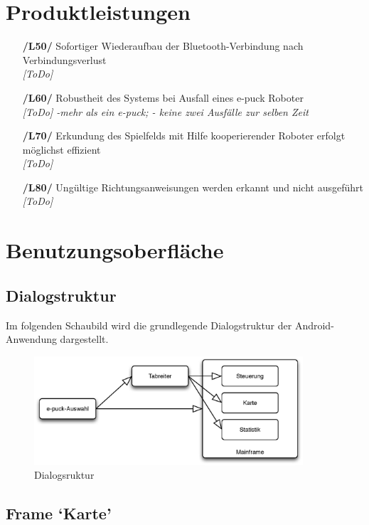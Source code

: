 \documentclass[10pt,a4paper]{article}
\let\oldsection\section
\renewcommand{\section}{\newpage \oldsection}
\begin{document}
	\section{Produktleistungen}
		\begin{itemize}
			\item[\textbf{/L50/}] Sofortiger Wiederaufbau der Bluetooth-Verbindung nach Verbindungsverlust
				\\ \textsl{[ToDo]}
			\item[\textbf{/L60/}] Robustheit des Systems bei Ausfall eines e-puck Roboter
				\\ \textsl{[ToDo] -mehr als ein e-puck; - keine zwei Ausfälle zur selben Zeit}
			\item[\textbf{/L70/}] Erkundung des Spielfelds mit Hilfe kooperierender Roboter erfolgt möglichst effizient
				\\ \textsl{[ToDo]}						
			\item[\textbf{/L80/}] Ungültige Richtungsanweisungen werden erkannt und nicht ausgeführt 
				\\ \textsl{[ToDo]}					
		\end{itemize}						
	\section{Benutzungsoberfläche}
	
			\subsection{Dialogstruktur}
			Im folgenden Schaubild wird die grundlegende Dialogstruktur der Android-Anwendung dargestellt.
			
			\begin{figure}[h]
				\centering
				\includegraphics[width=10cm]{dialog.eps}
  				\caption{Dialogsruktur}
  			\end{figure}			
			
			\subsection{Frame `Karte'}
\end{document}

